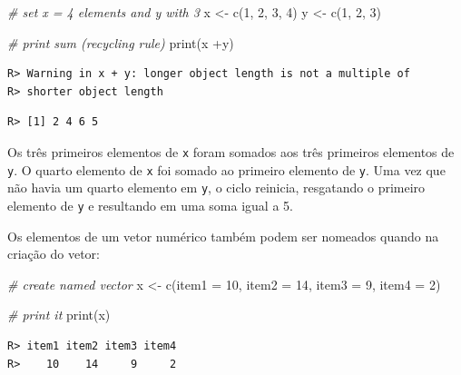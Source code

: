 \documentclass[
  11pt,
]{book}
\newenvironment{Shaded}{\begin{snugshade}}{\end{snugshade}}
\newcommand{\AttributeTok}[1]{\textcolor[rgb]{0.61,0.61,0.61}{#1}}
\newcommand{\CommentTok}[1]{\textcolor[rgb]{0.37,0.37,0.37}{\textit{#1}}}
\newcommand{\DecValTok}[1]{\textcolor[rgb]{0.06,0.06,0.06}{#1}}
\newcommand{\FunctionTok}[1]{\textcolor[rgb]{0,0,0}{#1}}
\newcommand{\NormalTok}[1]{#1}
\newcommand{\OtherTok}[1]{\textcolor[rgb]{0.37,0.37,0.37}{#1}}
\newcommand{\SpecialCharTok}[1]{\textcolor[rgb]{0,0,0}{#1}}
\begin{document}
\begin{Shaded}
\begin{Highlighting}[]
\CommentTok{\# set x = 4 elements and y with 3}
\NormalTok{x }\OtherTok{\textless{}{-}} \FunctionTok{c}\NormalTok{(}\DecValTok{1}\NormalTok{, }\DecValTok{2}\NormalTok{, }\DecValTok{3}\NormalTok{, }\DecValTok{4}\NormalTok{)}
\NormalTok{y }\OtherTok{\textless{}{-}} \FunctionTok{c}\NormalTok{(}\DecValTok{1}\NormalTok{, }\DecValTok{2}\NormalTok{, }\DecValTok{3}\NormalTok{)}

\CommentTok{\# print sum (recycling rule)}
\FunctionTok{print}\NormalTok{(x }\SpecialCharTok{+}\NormalTok{y)}
\end{Highlighting}
\end{Shaded}

\begin{verbatim}
R> Warning in x + y: longer object length is not a multiple of
R> shorter object length
\end{verbatim}

\begin{verbatim}
R> [1] 2 4 6 5
\end{verbatim}

Os três primeiros elementos de \texttt{x} foram somados aos três primeiros elementos de \texttt{y}. O quarto elemento de \texttt{x} foi somado ao primeiro elemento de \texttt{y}. Uma vez que não havia um quarto elemento em \texttt{y}, o ciclo reinicia, resgatando o primeiro elemento de \texttt{y} e resultando em uma soma igual a 5.

Os elementos de um vetor numérico também podem ser nomeados quando na criação do vetor:

\begin{Shaded}
\begin{Highlighting}[]
\CommentTok{\# create named vector}
\NormalTok{x }\OtherTok{\textless{}{-}} \FunctionTok{c}\NormalTok{(}\AttributeTok{item1 =} \DecValTok{10}\NormalTok{,}
       \AttributeTok{item2 =} \DecValTok{14}\NormalTok{,}
       \AttributeTok{item3 =} \DecValTok{9}\NormalTok{,}
       \AttributeTok{item4 =} \DecValTok{2}\NormalTok{)}

\CommentTok{\# print it}
\FunctionTok{print}\NormalTok{(x)}
\end{Highlighting}
\end{Shaded}

\begin{verbatim}
R> item1 item2 item3 item4 
R>    10    14     9     2
\end{verbatim}
\end{document}

